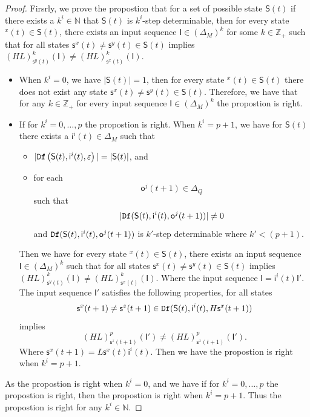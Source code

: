 \begin{proof} Firsrly, we prove the propostion that for a set of possible state $\mathsf{S}(t)$ if there exists a $k^{i}\in \mathbb{N}$ that $\mathsf{S}(t)$ is $k^{i}$-step determinable, then for every state \State$^{x}(t)$$\in \mathsf{S}(t)$, there exists an input sequence $\mathsf{I}\in(\Delta_M)^k$ for some $k\in \mathbb{Z}_+$ such that for all states $\mathsf{s}^{x}(t)\neq \mathsf{s}^{y}(t)\in \mathsf{S}(t)$ implies $(HL)^k_{\mathsf{s}^{y}(t)}(\mathsf{I})\neq (HL)^k_{{\mathsf{s}^{x}(t)}}(\mathsf{I})$.
\begin{itemize}
\item When $k^{i}=0$, we have $|\mathsf{S}(t)|=1$, then for every state \State$^{x}(t)$$\in \mathsf{S}(t)$ there does not exist any state $\mathsf{s}^{x}(t)\neq \mathsf{s}^{y}(t)\in \mathsf{S}(t)$. Therefore, we have that for any $k\in \mathbb{Z}_+$ for every input sequence $\mathsf{I}\in(\Delta_M)^k$ the propostion is right. 
\item If for $k^{i}=0,\ldots, p$ the propostion is right. When $k^{i}=p+1$, we have for $\mathsf{S}(t)$ there exists a $\mathsf{i}^{i}(t)\in \Delta_M$ such that
 \begin{itemize}
 \item  $|{\tt Df}\left(\mathsf{S}(t),\mathsf{i}^{i}(t),\varepsilon\right)|=|\mathsf{S}(t)|$, and 
 \item  for each \[\mathsf{o}^{j}(t+1)\in \Delta_Q\] such that \[|{\tt Df}(\mathsf{S}(t),\mathsf{i}^{i}(t),\mathsf{o}^{j}(t+1))|\neq 0\] and ${\tt Df}(\mathsf{S}(t),\mathsf{i}^{i}(t),\mathsf{o}^{j}(t+1))$ is $k'$-step determinable where ${k'}<(p+1)$.
 \end{itemize}
 Then we have for every state \State$^{x}(t)$$\in \mathsf{S}(t)$, there exists an input sequence $\mathsf{I}\in(\Delta_M)^k$ such that for all states $\mathsf{s}^{x}(t)\neq \mathsf{s}^{y}(t)\in \mathsf{S}(t)$ implies $(HL)^k_{\mathsf{s}^{y}(t)}(\mathsf{I})\neq (HL)^k_{{\mathsf{s}^{x}(t)}}(\mathsf{I})$. Where the input sequence $\mathsf{I}=\mathsf{i}^{i}(t)\mathsf{I}'$. The input sequence $\mathsf{I}'$ satisfies the following properties, %
  for all states \[\mathsf{s}^{x}(t+1)\neq \mathsf{s}^{z}(t+1)\in {\tt Df}(\mathsf{S}(t),\mathsf{i}^{i}(t),H\mathsf{s}^{x}(t+1))\] implies \[(HL)^p_{\mathsf{s}^{z}(t+1)}(\mathsf{I}')\neq (HL)^p_{{\mathsf{s}^{x}(t+1)}}(\mathsf{I}').\] Where $\mathsf{s}^{x}(t+1)=L\mathsf{s}^{x}(t)\mathsf{i}^{i}(t)$. Then we have the propostion is right when $k^{i}=p+1$. 
\end{itemize}
As the propostion is right when $k^{i}=0$, and we have if for $k^{i}=0,\ldots, p$ the propostion is right, then the propostion is right when $k^{i}=p+1$. Thus the propostion is right for any $k^{i}\in \mathbb{N}$.


\end{proof}
